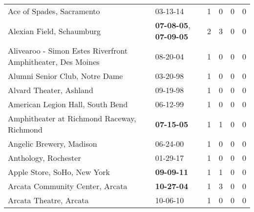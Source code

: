 \begin{longtable}{p{}p{}p{}p{}p{}p{}}
                                                    Ace of Spades, Sacramento &                                                03-13-14\textsuperscript{} &  1 &  0 &  0 &  0 \\
                                                    Alexian Field, Schaumburg &  \textbf{07-08-05\textsuperscript{}}, \textbf{07-09-05\textsuperscript{}} &  2 &  3 &  0 &  0 \\
                  Alivearoo - Simon Estes Riverfront Amphitheater, Des Moines &                                                08-20-04\textsuperscript{} &  1 &  0 &  0 &  0 \\
                                               Alumni Senior Club, Notre Dame &                                                03-20-98\textsuperscript{} &  1 &  0 &  0 &  0 \\
                                                      Alvard Theater, Ashland &                                                09-19-98\textsuperscript{} &  1 &  0 &  0 &  0 \\
                                             American Legion Hall, South Bend &                                                06-12-99\textsuperscript{} &  1 &  0 &  0 &  0 \\
                                   Amphitheater at Richmond Raceway, Richmond &                                       \textbf{07-15-05\textsuperscript{}} &  1 &  1 &  0 &  0 \\
                                                     Angelic Brewery, Madison &                                                06-24-00\textsuperscript{} &  1 &  0 &  0 &  0 \\
                                                         Anthology, Rochester &                                                01-29-17\textsuperscript{} &  1 &  0 &  0 &  0 \\
                                                  Apple Store, SoHo, New York &                                       \textbf{09-09-11\textsuperscript{}} &  1 &  1 &  0 &  0 \\
                                              Arcata Community Center, Arcata &                                       \textbf{10-27-04\textsuperscript{}} &  1 &  3 &  0 &  0 \\
                                                       Arcata Theatre, Arcata &                                                10-06-10\textsuperscript{} &  1 &  0 &  0 &  0 \\

\end{longtable}
